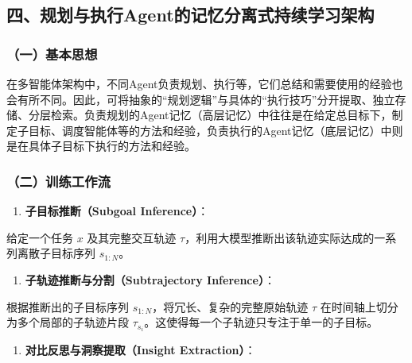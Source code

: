\hypertarget{ux56dbux89c4ux5212ux4e0eux6267ux884cagentux7684ux8bb0ux5fc6ux5206ux79bbux5f0fux6301ux7eedux5b66ux4e60ux67b6ux6784}{%
\subsection{四、规划与执行Agent的记忆分离式持续学习架构}\label{ux56dbux89c4ux5212ux4e0eux6267ux884cagentux7684ux8bb0ux5fc6ux5206ux79bbux5f0fux6301ux7eedux5b66ux4e60ux67b6ux6784}}

\hypertarget{ux4e00ux57faux672cux601dux60f3-3}{%
\subsubsection{（一）基本思想}\label{ux4e00ux57faux672cux601dux60f3-3}}

在多智能体架构中，不同Agent负责规划、执行等，它们总结和需要使用的经验也会有所不同。因此，可将抽象的``规划逻辑''与具体的``执行技巧''分开提取、独立存储、分层检索。负责规划的Agent记忆（高层记忆）中往往是在给定总目标下，制定子目标、调度智能体等的方法和经验，负责执行的Agent记忆（底层记忆）中则是在具体子目标下执行的方法和经验。

\hypertarget{ux4e8cux8badux7ec3ux5de5ux4f5cux6d41}{%
\subsubsection{（二）训练工作流}\label{ux4e8cux8badux7ec3ux5de5ux4f5cux6d41}}

\begin{enumerate}
\def\labelenumi{\arabic{enumi}.}
\tightlist
\item
  \textbf{子目标推断（Subgoal Inference）}：
\end{enumerate}

给定一个任务 \(x\) 及其完整交互轨迹 \(\tau\)，利用大模型推断出该轨迹实际达成的一系列离散子目标序列 \(s_{1:N}\)。

\begin{enumerate}
\def\labelenumi{\arabic{enumi}.}
\setcounter{enumi}{1}
\tightlist
\item
  \textbf{子轨迹推断与分割（Subtrajectory Inference）}：
\end{enumerate}

根据推断出的子目标序列 \(s_{1:N}\)，将冗长、复杂的完整原始轨迹 \(\tau\) 在时间轴上切分为多个局部的子轨迹片段 \(\tau_{s_i}\)。这使得每一个子轨迹只专注于单一的子目标。

\begin{enumerate}
\def\labelenumi{\arabic{enumi}.}
\setcounter{enumi}{2}
\tightlist
\item
  \textbf{对比反思与洞察提取（Insight Extraction）}：
\end{enumerate}


